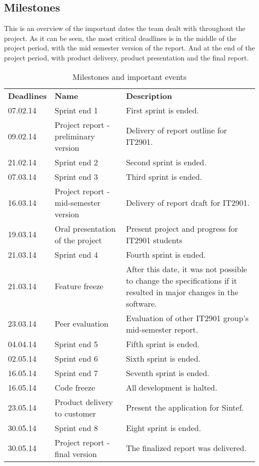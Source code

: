 \subsection{Milestones}
This is an overview of the important dates the team dealt with throughout the project. As it can be seen, the most critical deadlines is in the middle of the project period, with the mid semester version of the report. And at the end of the project period, with product delivery, product presentation and the final report.
\begin{table}[H]
\centering
{}
\begin{tabular}{|l|p{6.7cm}|p{6.5cm}|}
\hline
\textbf{Deadlines} & \textbf{Name} & \textbf{Description}\\
07.02.14 & Sprint end 1 & First sprint is ended. \\
09.02.14& Project report - preliminary version & Delivery of report outline for IT2901.\\
21.02.14& Sprint end 2 & Second sprint is ended. \\
07.03.14& Sprint end 3 & Third sprint is ended.\\
16.03.14& Project report - mid-semester version &  Delivery of report draft for IT2901. \\
19.03.14 & Oral presentation of the project & Present project and progress for IT2901 students\\
21.03.14& Sprint end 4 & Fourth sprint is ended.\\
21.03.14 & Feature freeze & After this date, it was not possible to change the specifications if it resulted in major changes in the software.\\
23.03.14 & Peer evaluation &  Evaluation of other IT2901 group's mid-semester report. \\
04.04.14& Sprint end 5 & Fifth sprint is ended.\\
02.05.14& Sprint end 6 & Sixth sprint is ended.\\
16.05.14& Sprint end 7 & Seventh sprint is ended.\\
16.05.14& Code freeze & All development is halted.\\
23.05.14& Product delivery to customer & Present the application for Sintef.\\ 
30.05.14& Sprint end 8 & Eight sprint is ended.\\
30.05.14 & Project report - final version & The finalized report was delivered.\\\hline
\end{tabular}
\caption{Milestones and important events}
\label{tab:milestones}
\end{table}

